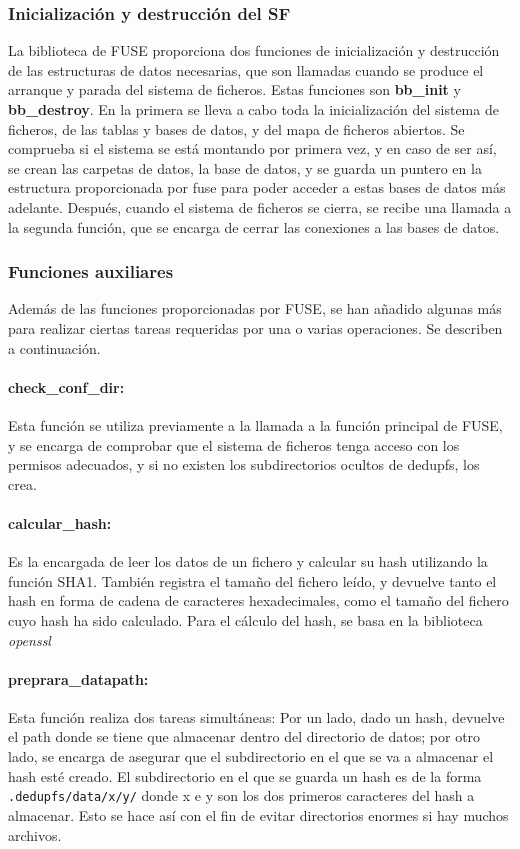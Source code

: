 \documentclass[12pt,a4paper]{article}
\begin{document}
\subsubsection{Inicialización y destrucción del SF}

La biblioteca de FUSE proporciona dos funciones de inicialización y destrucción de las estructuras de datos necesarias, que son llamadas cuando se produce el arranque y parada del sistema de ficheros. Estas funciones son \textbf{bb\_init} y \textbf{bb\_destroy}. En la primera se lleva a cabo toda la inicialización del sistema de ficheros, de las tablas y bases de datos, y del mapa de ficheros abiertos. Se comprueba si el sistema se está montando por primera vez, y en caso de ser así, se crean las carpetas de datos, la base de datos, y se guarda un puntero en la estructura proporcionada por fuse para poder acceder a estas bases de datos más adelante. Después, cuando el sistema de ficheros se cierra, se recibe una llamada a la segunda función, que se encarga de cerrar las conexiones a las bases de datos.

\subsubsection{Funciones auxiliares}

Además de las funciones proporcionadas por FUSE, se han añadido algunas más para realizar ciertas tareas requeridas por una o varias operaciones. Se describen a continuación.

\paragraph{check\_conf\_dir:} Esta función se utiliza previamente a la llamada a la función principal de FUSE, y se encarga de comprobar que el sistema de ficheros tenga acceso con los permisos adecuados, y si no existen los subdirectorios ocultos de dedupfs, los crea.

\paragraph{calcular\_hash:} Es la encargada de leer los datos de un fichero y calcular su hash utilizando la función SHA1. También registra el tamaño del fichero leído, y devuelve tanto el hash en forma de cadena de caracteres hexadecimales, como el tamaño del fichero cuyo hash ha sido calculado. Para el cálculo del hash, se basa en la biblioteca \emph{openssl}

\paragraph{preprara\_datapath:} Esta función realiza dos tareas simultáneas: Por un lado, dado un hash, devuelve el path donde se tiene que almacenar dentro del directorio de datos; por otro lado, se encarga de asegurar que el subdirectorio en el que se va a almacenar el hash esté creado. El subdirectorio en el que se guarda un hash es de la forma \texttt{\small .dedupfs/data/x/y/} donde x e y son los dos primeros caracteres del hash a almacenar. Esto se hace así con el fin de evitar directorios enormes si hay muchos archivos.
\end{document}
